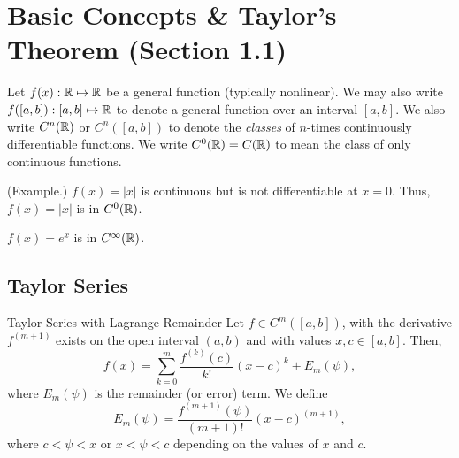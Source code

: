 \documentclass[letterpaper]{article}
\begin{document}
\section{Basic Concepts \& Taylor's Theorem (Section 1.1)}
Let $f(x): \mathbb{R} \mapsto \mathbb{R}$ be a general function (typically nonlinear). We may also write $f([a, b]): [a, b] \mapsto \mathbb{R}$ to denote a general function over an interval $[a, b]$. We also write $C^n (\mathbb{R})$ or $C^n ([a, b])$ to denote the \emph{classes} of $n$-times continuously differentiable functions. We write $C^0 (\mathbb{R}) = C(\mathbb{R})$ to mean the class of only continuous functions. 

\begin{mdframed}
    (Example.) $f(x) = |x|$ is continuous but is not differentiable at $x = 0$. Thus, $f(x) = |x|$ is in $C^0 (\mathbb{R})$. 

    \bigskip 

    $f(x) = e^x$ is in $C^\infty (\mathbb{R})$.
\end{mdframed}

\subsection{Taylor Series}
\begin{theorem}{Taylor Series with Lagrange Remainder}{}
    Let $f \in C^m ([a, b])$, with the derivative $f^{(m + 1)}$ exists on the open interval $(a, b)$ and with values $x, c \in [a, b]$. Then, 
    \[f(x) = \sum_{k = 0}^{m} \frac{f^{(k)} (c)}{k!} (x - c)^k + E_{m}(\psi),\] 
    where $E_{m}(\psi)$ is the remainder (or error) term. We define 
    \[E_{m}(\psi) = \frac{f^{(m + 1)}(\psi)}{(m + 1)!} (x - c)^{(m + 1)},\] 
    where $c < \psi < x$ or $x < \psi < c$ depending on the values of $x$ and $c$. 
\end{theorem}
\end{document}
